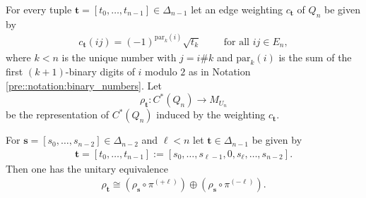 \documentclass[10pt,a4paper]{amsart}
\begin{document}
\begin{definition}
    \label{weig::def:representation_rho_t}
    For every tuple $\mathbf{t} = [t_0, \dots, t_{n-1}] \in \Delta_{n-1}$ let an edge weighting $c_\mathbf{t}$ of $Q_n$ be given by
    \begin{align*}
        c_\mathbf{t}(ij) = (-1)^{\mathrm{par}_k(i)} \sqrt{t_k} \qquad \text{ for all } ij \in E_n,
    \end{align*}
    where $k < n$ is the unique number with $j = i \# k$ and $\mathrm{par}_k(i)$ is the sum of the first $(k+1)$-binary digits of $i$ modulo $2$ as in Notation \ref{pre::notation:binary_numbers}. 
    Let 
    $$
        \rho_\mathbf{t}: C^\ast(Q_n) \to M_{U_n}
    $$    
    be the representation of $C^\ast(Q_n)$ induced by the weighting $c_\mathbf{t}$.
\end{definition} 

\begin{lemma}
    \label{reps::lemma:decomposition_of_rho_t_for_boundary_points}
    For $\mathbf{s} = [s_0, \dots, s_{n-2}] \in \Delta_{n-2}$ and $\ell < n$ let $\mathbf{t} \in \Delta_{n-1}$ be given by
    \begin{align*}
        \mathbf{t} = [t_0, \dots, t_{n-1}] := [s_0, \dots, s_{\ell-1}, 0, s_\ell, \dots, s_{n-2}].
    \end{align*}
    Then one has the unitary equivalence
    \begin{align*}
        \rho_\mathbf{t} \cong \left(\rho_\mathbf{s} \circ \pi^{(+\ell)}\right) \oplus \left(\rho_\mathbf{s} \circ \pi^{(-\ell)}\right).
    \end{align*}
\end{lemma}
\end{document}
